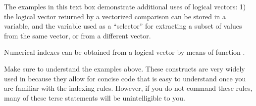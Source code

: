 \documentclass[krantz2]{krantz}\usepackage{knitr}
\begin{document}
\begin{playground}
The examples in this text box demonstrate additional uses of logical vectors: 1) the logical vector returned by a vectorized comparison can be stored in a variable, and the variable used as a ``selector'' for extracting a subset of values from the same vector, or from a different vector.

\begin{knitrout}\footnotesize
{}\color{fgcolor}\begin{kframe}
\begin{alltt}
 \hlkwb{<-} \hlstd{letters[}\hlopt{:}\hlstd{]}
 \hlkwb{<-} \hlopt{:}
 \hlkwb{<-}  \hlopt{>} 
\end{alltt}
\end{kframe}
\end{knitrout}

Numerical indexes can be obtained from a logical vector by means of function .

\begin{knitrout}\footnotesize
{}\color{fgcolor}\begin{kframe}
\begin{alltt}
 \hlkwb{<-}  \hlopt{>} \hlstd{)}
\end{alltt}
\end{kframe}
\end{knitrout}

Make sure to understand the examples above. These constructs are very widely used in \Rlang because they allow for concise code that is easy to understand once you are familiar with the indexing rules. However, if you do not command these rules, many of these terse statements will be unintelligible to you.
\end{playground}
\end{document}
